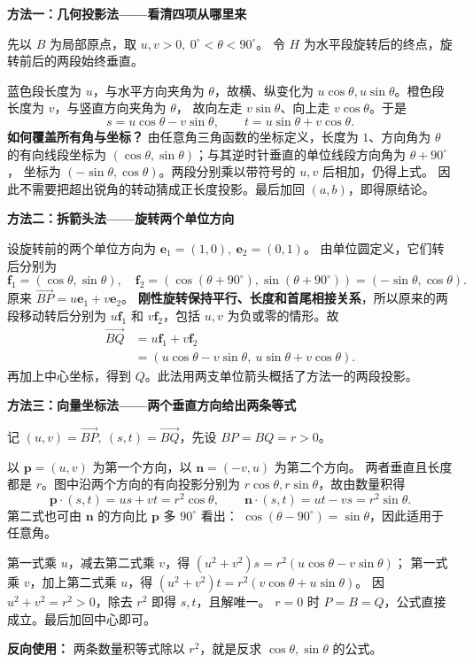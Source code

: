\begin{proofbox}
\textbf{方法一：几何投影法——看清四项从哪里来}

先以 $B$ 为局部原点，取 $u,v>0,\ 0^\circ<\theta<90^\circ$。
令 $H$ 为水平段旋转后的终点，旋转前后的两段始终垂直。

蓝色段长度为 $u$，与水平方向夹角为 $\theta$，故横、纵变化为
$u\cos\theta,u\sin\theta$。橙色段长度为 $v$，与竖直方向夹角为 $\theta$，
故向左走 $v\sin\theta$、向上走 $v\cos\theta$。于是
\[
s=u\cos\theta-v\sin\theta,\qquad
t=u\sin\theta+v\cos\theta.
\]
\textbf{如何覆盖所有角与坐标？}
由任意角三角函数的坐标定义，长度为 $1$、方向角为 $\theta$ 的有向线段坐标为
$(\cos\theta,\sin\theta)$；与其逆时针垂直的单位线段方向角为 $\theta+90^\circ$，
坐标为 $(-\sin\theta,\cos\theta)$。两段分别乘以带符号的 $u,v$ 后相加，仍得上式。
因此不需要把超出锐角的转动猜成正长度投影。最后加回 $(a,b)$，即得原结论。
\end{proofbox}
\clearpage
\begin{proofbox}
\textbf{方法二：拆箭头法——旋转两个单位方向}

设旋转前的两个单位方向为 $\mathbf e_1=(1,0),\ \mathbf e_2=(0,1)$。
由单位圆定义，它们转后分别为
\[
\mathbf f_1=(\cos\theta,\sin\theta),\quad
\mathbf f_2=(\cos(\theta+90^\circ),\sin(\theta+90^\circ))
=(-\sin\theta,\cos\theta).
\]
原来 $\overrightarrow{BP}=u\mathbf e_1+v\mathbf e_2$。
\textbf{刚性旋转保持平行、长度和首尾相接关系}，所以原来的两段移动转后分别为
$u\mathbf f_1$ 和 $v\mathbf f_2$，包括 $u,v$ 为负或零的情形。故
\[
\begin{aligned}
\overrightarrow{BQ}&=u\mathbf f_1+v\mathbf f_2\\
&=(u\cos\theta-v\sin\theta,\ u\sin\theta+v\cos\theta).
\end{aligned}
\]
再加上中心坐标，得到 $Q$。此法用两支单位箭头概括了方法一的两段投影。
\end{proofbox}
\clearpage
\begin{proofbox}
\textbf{方法三：向量坐标法——两个垂直方向给出两条等式}

记 $(u,v)=\overrightarrow{BP},\ (s,t)=\overrightarrow{BQ}$，先设 $BP=BQ=r>0$。

以 $\mathbf p=(u,v)$ 为第一个方向，以 $\mathbf n=(-v,u)$ 为第二个方向。
两者垂直且长度都是 $r$。图中沿两个方向的有向投影分别为 $r\cos\theta,r\sin\theta$，故由数量积得
\[
\mathbf p\cdot(s,t)=us+vt=r^2\cos\theta,\qquad
\mathbf n\cdot(s,t)=ut-vs=r^2\sin\theta.
\]
第二式也可由 $\mathbf n$ 的方向比 $\mathbf p$ 多 $90^\circ$ 看出：
$\cos(\theta-90^\circ)=\sin\theta$，因此适用于任意角。

第一式乘 $u$，减去第二式乘 $v$，得
$(u^2+v^2)s=r^2(u\cos\theta-v\sin\theta)$；
第一式乘 $v$，加上第二式乘 $u$，得
$(u^2+v^2)t=r^2(v\cos\theta+u\sin\theta)$。
因 $u^2+v^2=r^2>0$，除去 $r^2$ 即得 $s,t$，且解唯一。
$r=0$ 时 $P=B=Q$，公式直接成立。最后加回中心即可。

\textbf{反向使用：} 两条数量积等式除以 $r^2$，就是反求 $\cos\theta,\sin\theta$ 的公式。
\end{proofbox}
